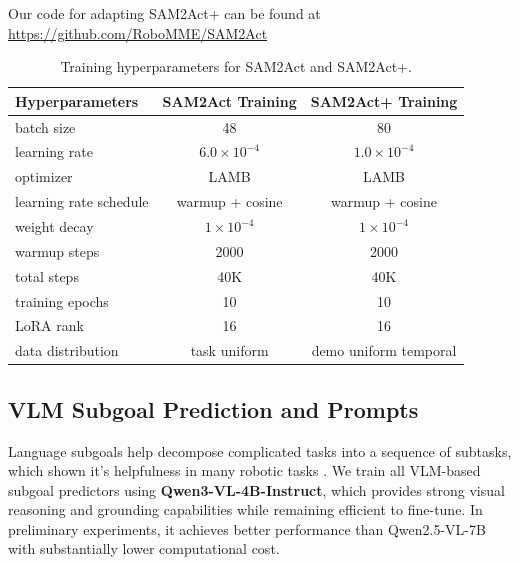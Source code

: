 Our code for adapting SAM2Act+ can be found at \url{https://github.com/RoboMME/SAM2Act}

\begin{table}[h]
\centering
\small
\caption{Training hyperparameters for SAM2Act and SAM2Act+.}
\label{tab:sam2actplus_train_hparams}
\begin{tabular}{lcc}
\toprule
\textbf{Hyperparameters} & \textbf{SAM2Act Training} & \textbf{SAM2Act+ Training} \\
\midrule
batch size  & 48 & 80 \\
learning rate & $6.0\times10^{-4}$ & $1.0\times10^{-4}$ \\
optimizer & LAMB  & LAMB \\
learning rate schedule & warmup + cosine & warmup + cosine \\
weight decay & $1\times10^{-4}$ & $1\times10^{-4}$ \\
warmup steps & 2000 & 2000 \\
total steps & 40K & 40K \\
training epochs & 10 & 10 \\
LoRA rank & 16 & 16 \\
data distribution & task uniform & demo uniform temporal\\
\bottomrule
\end{tabular}
\end{table}





\clearpage
\subsection{VLM Subgoal Prediction and Prompts}
\label{sec:VLM_subgoal}

Language subgoals help decompose complicated tasks into a sequence of subtasks, which shown it's helpfulness in many robotic tasks \cite{dai2025racer, lin2026systematic, dai2024think}. 
We train all VLM-based subgoal predictors using \textbf{Qwen3-VL-4B-Instruct}, which provides strong visual reasoning and grounding capabilities while remaining efficient to fine-tune. In preliminary experiments, it achieves better performance than Qwen2.5-VL-7B with substantially lower computational cost.

